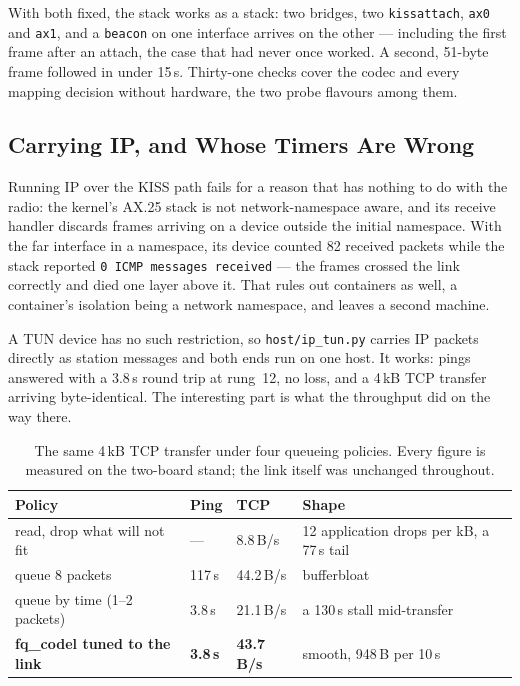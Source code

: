 With both fixed, the stack works as a stack: two bridges, two
\texttt{kissattach}, \texttt{ax0} and \texttt{ax1}, and a
\texttt{beacon} on one interface arrives on the other --- including the
first frame after an attach, the case that had never once worked.  A
second, 51-byte frame followed in under 15\,s.  Thirty-one checks cover
the codec and every mapping decision without hardware, the two probe
flavours among them.

\subsection{Carrying IP, and Whose Timers Are Wrong}
\label{sec:cport_iptun}

Running IP over the KISS path fails for a reason that has nothing to do
with the radio: the kernel's AX.25 stack is not network-namespace
aware, and its receive handler discards frames arriving on a device
outside the initial namespace.  With the far interface in a namespace,
its device counted 82 received packets while the stack reported
\texttt{0 ICMP messages received} --- the frames crossed the link
correctly and died one layer above it.  That rules out containers as
well, a container's isolation being a network namespace, and leaves a
second machine.

A TUN device has no such restriction, so \texttt{host/ip\_tun.py}
carries IP packets directly as station messages and both ends run on
one host.  It works: pings answered with a 3.8\,s round trip at
rung~12, no loss, and a 4\,kB TCP transfer arriving byte-identical.
The interesting part is what the throughput did on the way there.

\begin{table}[H]
    \centering
    \caption{The same 4\,kB TCP transfer under four queueing policies.
             Every figure is measured on the two-board stand; the link
             itself was unchanged throughout.}
    \label{tab:iptun}
    \small
    \begin{tabular}{@{}lllp{5.4cm}@{}}
    \toprule
    \textbf{Policy} & \textbf{Ping} & \textbf{TCP} & \textbf{Shape} \\
    \midrule
    read, drop what will not fit & --- & 8.8\,B/s &
    12 application drops per kB, a 77\,s tail \\
    queue 8 packets & 117\,s & 44.2\,B/s & bufferbloat \\
    queue by time (1--2 packets) & 3.8\,s & 21.1\,B/s &
    a 130\,s stall mid-transfer \\
    \textbf{fq\_codel tuned to the link} & \textbf{3.8\,s} &
    \textbf{43.7\,B/s} & smooth, 948\,B per 10\,s \\
    \bottomrule
    \end{tabular}
\end{table}

